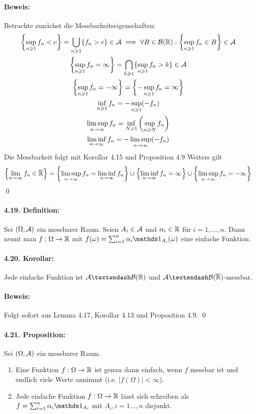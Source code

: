 \documentclass[12pt]{report}
\begin{document}
 \paragraph{Beweis:}Betrachte zun\"achst die Messbarkeitseigenschaften:
 \begin{gather*}
     \left\{\sup_{n\geqslant1}f_n<c\right\}=\bigcup_{n\geqslant1}\{f_n>c\}\in\mathcal{A}\implies\forall B\in\mathcal{B}(\mathbb{R}):\left\{\sup_{n\geqslant1}f_n\in B\right\}\in\mathcal{A} \\
     \left\{\sup_{n\geqslant1}f_n=\infty\right\}=\bigcap_{k\geqslant1}\{\sup_{n\geqslant1}f_n>k\}\in\mathcal{A}\\
     \left\{\sup_{n\geqslant1}f_n=-\infty\right\}=\left\{-\sup_{n\geqslant1}f_n=\infty\right\} \\ 
     \inf_{n\geqslant1}f_n=-\sup_{n\geqslant1}(-f_n) \\
     \limsup_{n\to\infty}f_n=\inf_{N\geqslant1}\left(\sup_{n\geqslant N}f_n\right) \\
     \liminf_{n\to\infty}f_n=-\limsup_{n\to\infty}(-f_n)
 \end{gather*}
 Die Messbarkeit folgt mit Korollar 4.15 und Proposition 4.9
 Weiters gilt
 $$\left\{\lim_{n\to\infty}f_n\in\overline{\mathbb{R}}\right\}=\left\{\limsup_{n\to\infty}f_n=\liminf_{n\to\infty}f_n\right\}\cup\left\{\liminf_{n\to\infty}f_n=\infty\right\}\cup\left\{\limsup_{n\to\infty}f_n=-\infty\right\}$$
 \qed
 
 \paragraph{4.19. Definition:}Sei $(\Omega,\mathcal{A})$ ein messbarer Raum. Seien $A_i\in\mathcal{A}$ und $\alpha_i\in\mathbb{R}$ f\"ur $i=1,\hdots,n$. Dann nennt man $f:\Omega\to\mathbb{R}$ mit $f(\omega)=\sum_{i=1}^n \alpha_i\ind{A_i}(\omega)$ eine einfache Funktion. 
 
 \paragraph{4.20. Korollar:}Jede einfache Funktion ist $\A\textendash\borel$ und $\A\textendash\cB(\overline\R)$-messbar.
 
 \paragraph{Beweis:}Folgt sofort aus Lemma 4.17, Korollar 4.13 und Proposition 4.9. \qed
 
 \paragraph{4.21. Proposition:}Sei $(\Omega,\mathcal{A})$ ein messbarer Raum.
\begin{enumerate}[label=(\roman*)]
    \item Eine Funktion $f:\Omega\to\mathbb{R}$ ist genau dann einfach, wenn $f$ messbar ist und endlich viele Werte annimmt (i.e. $|f(\Omega)|<\infty$). 
    \item Jede einfache Funktion $f:\Omega\to\mathbb{R}$ l\"asst sich schreiben als $f=\sum_{i=1}^n \alpha_i\ind{A_i}$ mit $A_i,i=1\hdots,n$ disjunkt.
\end{enumerate}
\end{document}
